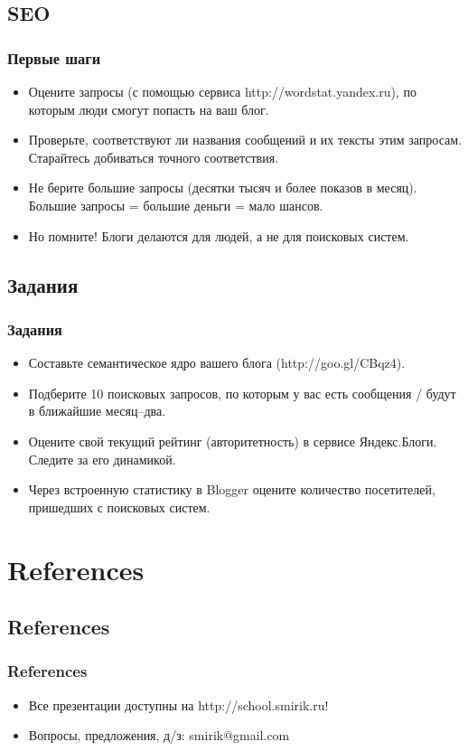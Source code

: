 \documentclass[compress,red]{beamer}
\begin{document}
\subsection{SEO}
\begin{frame}
	\frametitle{Первые шаги}
	\begin{itemize}
		\item Оцените запросы (с помощью сервиса http://wordstat.yandex.ru), по которым люди смогут попасть на ваш блог.
		\item Проверьте, соответствуют ли названия сообщений и их тексты этим запросам. Старайтесь добиваться точного соответствия.
		\item Не берите большие запросы (десятки тысяч и более показов в месяц). Большие запросы = большие деньги = мало шансов.
		\item Но помните! Блоги делаются для людей, а не для поисковых систем.
	\end{itemize}
\end{frame}

\subsection{Задания}
\begin{frame}
  \frametitle{Задания}
  \begin{itemize}
    \item Составьте семантическое ядро вашего блога (http://goo.gl/CBqz4).
		\item Подберите 10 поисковых запросов, по которым у вас есть сообщения / будут в ближайшие месяц--два.
		\item Оцените свой текущий рейтинг (авторитетность) в сервисе Яндекс.Блоги. Следите за его динамикой.
		\item Через встроенную статистику в Blogger оцените количество посетителей, пришедших с поисковых систем.
  \end{itemize}
\end{frame}

\section{References}
\subsection{References}
\begin{frame}[fragile]
  \frametitle{References}
  \begin{itemize}
    \item Все презентации доступны на http://school.smirik.ru!
    \item Вопросы, предложения, д/з: smirik@gmail.com
  \end{itemize}
\end{frame}
\end{document}
